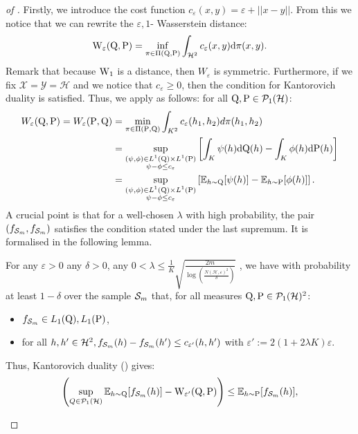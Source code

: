 \begin{proof}[of ]
Firstly, we introduce the cost function $c_{\varepsilon}(x,y)= \varepsilon + ||x-y||$.
From this we notice that we can rewrite the $\varepsilon,1$- Wasserstein distance:
\[ \mathrm{W}_{\varepsilon}(\mathrm{Q},\mathrm{P})= \inf_{\pi \in \Pi(\mathrm{Q},\mathrm{P})} \int_{\mathcal{H}^2} c_{\varepsilon}(x,y)\mathrm{d}\pi(x,y).  \]
Remark that because $\mathrm{W}_{1}$ is a distance, then $W_\varepsilon$ is symmetric. Furthermore, if we fix $\mathcal{X}=\mathcal{Y}=\mathcal{H}$ and we notice that $c_{\varepsilon}\geq 0$, then the condition for Kantorovich duality is satisfied. Thus, we apply  as follows: for all $\mathrm{Q},\mathrm{P}\in \mathcal{P}_1(\mathcal{H})$:
\begin{align*}
W_\varepsilon(\mathrm{Q},\mathrm{P})= W_\varepsilon(\mathrm{P},\mathrm{Q}) & =  \min _{\pi \in \Pi(\mathrm{P}, \mathrm{Q})}  \int_{K^2} c_{\varepsilon}(h_1, h_2) d \pi(h_1, h_2)  \\
&=\sup_{\substack{(\psi, \phi) \in L^1(\mathrm{Q}) \times L^1(\mathrm{P})\\ \psi-\phi \leq c_{\varepsilon}}}\left[\int_{K} \psi(h) \mathrm{d}\mathrm{Q}(h)- \int_{K} \phi(h) \mathrm{d}\mathrm{P}(h)\right] \\
& = \sup_{\substack{(\psi, \phi) \in L^1(\mathrm{Q}) \times L^1(\mathrm{P})\\ \psi-\phi \leq c_{\varepsilon}}}\left[\mathbb{E}_{h\sim \mathrm{Q}}[ \psi(h)]- \mathbb{E}_{h\sim \mathrm{P}}[ \phi(h)]\right].
\end{align*}
A crucial point is that for a well-chosen $\lambda$ with high probability, the pair $(f_{\mathcal{S}_m},f_{\mathcal{S}_m})$ satisfies the condition stated under the last supremum. It is formalised in the following lemma.
\begin{lemma}
\label{lem:kk}
For any $\varepsilon>0$ any $\delta>0$, any $0<\lambda\leq \frac{1}{K}\sqrt{\frac{2m}{\log\left(\frac{N(\mathcal{H},\varepsilon)^2}{\delta}\right)}}$ , we have with probability at least $1-\delta$ over the sample $\mathcal{S}_m$ that, for all measures $\mathrm{Q},\mathrm{P}\in\mathcal{P}_1(\mathcal{H})^2$:
\begin{itemize}
  \item $f_{\mathcal{S}_m}\in L_1(\mathrm{Q}),L_1(\mathrm{P})$,
  \item for all $h,h' \in \mathcal{H}^2, f_{\mathcal{S}_m}(h)-f_{\mathcal{S}_m}(h') \leq c_{\varepsilon'}(h,h')$ with $\varepsilon':= 2(1+2\lambda K) \varepsilon$.
\end{itemize}
Thus, Kantorovich duality () gives:
\[ \left(\sup_{Q\in \mathcal{P}_1(\mathcal{H})} \mathbb{E}_{h\sim \mathrm{Q}}[ f_{\mathcal{S}_m}(h)] -  \mathrm{W}_{\varepsilon'}(\mathrm{Q},\mathrm{P}) \right)\leq \mathbb{E}_{h\sim \mathrm{P}}[ f_{\mathcal{S}_m}(h)],    \]

\end{lemma}
\end{proof}
